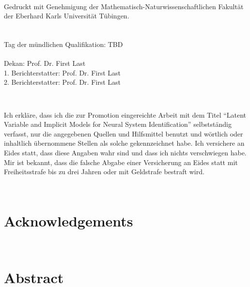 \documentclass[twoside, 12pt, a4paper]{report}
\begin{document}
\def\biblio{}



\newpage 
\ %

\newpage
\vspace*{\fill}
Gedruckt mit Genehmigung der Mathematisch-Naturwissenschaftlichen Fakultät der Eberhard Karls Universität Tübingen. \\ \\ \\
Tag der mündlichen Qualifikation: \tab TBD \\ \\%
Dekan: \tab Prof. Dr. First Last \\
1. Berichterstatter: \tab Prof. Dr. First Last \\
2. Berichterstatter: \tab Prof. Dr. First Last

\newpage 
\ %

\newpage
\vspace*{\fill}
Ich erkläre, dass ich die zur Promotion eingereichte Arbeit mit dem Titel “Latent Variable and Implicit Models for Neural System Identification” selbstständig verfasst, nur die angegebenen Quellen und Hilfsmittel benutzt und wörtlich oder inhaltlich übernommene Stellen als solche gekennzeichnet habe. Ich versichere an Eides statt, dass diese Angaben wahr sind und dass ich nichts verschwiegen habe. Mir ist bekannt, dass die falsche Abgabe einer Versicherung an Eides statt mit Freiheitsstrafe bis zu drei Jahren oder mit Geldstrafe bestraft wird. 

\begingroup
  \centering
  \hspace{1cm}
  \par
\endgroup

\newpage 
\ %

\chapter*{Acknowledgements}
\label{ch:ack}
\lipsum[2-4]

\newpage 
\ %

\chapter*{Abstract}
\label{ch:abstract}
\lipsum[2-4]
\end{document}
